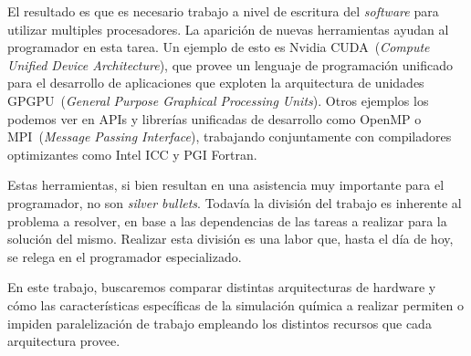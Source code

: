 El resultado es que es necesario trabajo a nivel de escritura del \textit{software} para utilizar multiples procesadores. 
La aparici\'on de nuevas herramientas ayudan al programador en esta tarea. 
Un ejemplo de esto es Nvidia CUDA~(\textit{Compute Unified Device Architecture}), que provee un lenguaje de programaci\'on unificado para el desarrollo de aplicaciones que exploten la arquitectura de unidades GPGPU~(\textit{General Purpose Graphical Processing Units}). 
Otros ejemplos los podemos ver en APIs y librer\'ias unificadas de desarrollo como OpenMP o MPI~(\textit{Message Passing Interface}), trabajando conjuntamente con compiladores
optimizantes como Intel ICC y PGI Fortran.

Estas herramientas, si bien resultan en una asistencia muy importante para el programador, no son \textit{silver bullets}. 
Todav\'ia la divisi\'on del trabajo es inherente al problema a resolver, en base a las dependencias de las tareas a realizar para la soluci\'on del mismo. 
Realizar esta divisi\'on es una labor que, hasta el d\'ia de hoy, se relega en el programador especializado.

En este trabajo, buscaremos comparar distintas arquitecturas de hardware y c\'omo las caracter\'isticas espec\'ificas de la simulaci\'on qu\'imica a realizar permiten o impiden paralelizaci\'on de trabajo empleando los distintos recursos que cada arquitectura provee.
